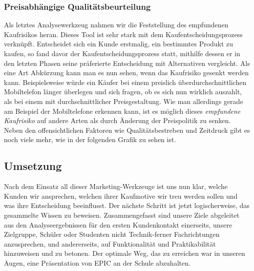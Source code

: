 \subsubsection{Preisabhängige Qualitätsbeurteilung}
Als letztes Analysewerkzeug nahmen wir die Feststellung des empfundenen Kaufrisikos heran. Dieses Tool ist sehr stark mit dem Kaufentscheidungsprozess verknüpft. Entscheidet sich ein Kunde erstmalig, ein bestimmtes Produkt zu kaufen, so fand davor der Kaufentscheidungsprozess statt, mithilfe dessen er in den letzten Phasen seine präferierte Entscheidung mit Alternativen vergleicht. Als eine Art Abkürzung kann man es nun sehen, wenn das Kaufrisiko gesenkt werden kann. Beispielsweise würde ein Käufer bei einem preislich überdurchschnittlichen Mobiltelefon länger überlegen und sich fragen, ob es sich nun wirklich auszahlt, als bei einem mit durchschnittlicher Preisgestaltung. Wie man allerdings gerade am Beispiel der Mobiltelefone erkennen kann, ist es möglich dieses \textit{empfundene Kaufrisiko} auf andere Arten als durch Änderung der Preispolitik zu senken. Neben den offensichtlichen Faktoren wie Qualitätsbestreben und Zeitdruck gibt es noch viele mehr, wie in der folgenden Grafik zu sehen ist.\\

\subsection{Umsetzung}
Nach dem Einsatz all dieser Marketing-Werkzeuge ist uns nun klar, welche Kunden wir ansprechen, welchen ihrer Kaufmotive wir treu werden sollen und was ihre Entscheidung beeinflusst. Der nächste Schritt ist jetzt logischerweise, das gesammelte Wissen zu beweisen. Zusammengefasst sind unsere Ziele abgeleitet aus den Analyseergebnissen für den ersten Kundenkontakt einerseits, unsere Zielgruppe, Schüler oder Studenten nicht Technik-ferner Fachrichtungen anzusprechen, und andererseits, auf Funktionalität und Praktikabilität hinzuweisen und zu betonen. Der optimale Weg, das zu erreichen war in unseren Augen, eine Präsentation von EPIC an der Schule abzuhalten.